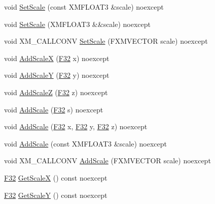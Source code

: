 \begin{DoxyCompactItemize}
\item 
void \hyperlink{structmage_1_1_transform_node_a135418b2bdc0ebdfb12cb747ece38d48}{Set\+Scale} (const X\+M\+F\+L\+O\+A\+T3 \&scale) noexcept
\item 
void \hyperlink{structmage_1_1_transform_node_aaaa992bbd1ebad4b858fcb28ce2781d0}{Set\+Scale} (X\+M\+F\+L\+O\+A\+T3 \&\&scale) noexcept
\item 
void X\+M\+\_\+\+C\+A\+L\+L\+C\+O\+NV \hyperlink{structmage_1_1_transform_node_ad90daae6725ce76c43429ef5ab90c2da}{Set\+Scale} (F\+X\+M\+V\+E\+C\+T\+OR scale) noexcept
\item 
void \hyperlink{structmage_1_1_transform_node_acdf6f3a092fa47d428f3f4e9215160d9}{Add\+ScaleX} (\hyperlink{namespacemage_aa97e833b45f06d60a0a9c4fc22ae02c0}{F32} x) noexcept
\item 
void \hyperlink{structmage_1_1_transform_node_ab41eee8e27e8f155c7de643841953b45}{Add\+ScaleY} (\hyperlink{namespacemage_aa97e833b45f06d60a0a9c4fc22ae02c0}{F32} y) noexcept
\item 
void \hyperlink{structmage_1_1_transform_node_ae4550e69f9197e400ec21a3665cb5e34}{Add\+ScaleZ} (\hyperlink{namespacemage_aa97e833b45f06d60a0a9c4fc22ae02c0}{F32} z) noexcept
\item 
void \hyperlink{structmage_1_1_transform_node_ac45f837c9dc6e8cd143a72337b69893e}{Add\+Scale} (\hyperlink{namespacemage_aa97e833b45f06d60a0a9c4fc22ae02c0}{F32} s) noexcept
\item 
void \hyperlink{structmage_1_1_transform_node_af50ac0e9e6d7f6d610e9e399ebf05716}{Add\+Scale} (\hyperlink{namespacemage_aa97e833b45f06d60a0a9c4fc22ae02c0}{F32} x, \hyperlink{namespacemage_aa97e833b45f06d60a0a9c4fc22ae02c0}{F32} y, \hyperlink{namespacemage_aa97e833b45f06d60a0a9c4fc22ae02c0}{F32} z) noexcept
\item 
void \hyperlink{structmage_1_1_transform_node_a7ae8445a7f447ae832efafdfc20c3add}{Add\+Scale} (const X\+M\+F\+L\+O\+A\+T3 \&scale) noexcept
\item 
void X\+M\+\_\+\+C\+A\+L\+L\+C\+O\+NV \hyperlink{structmage_1_1_transform_node_ae8d3002804b23e5f8fcf4bd092869819}{Add\+Scale} (F\+X\+M\+V\+E\+C\+T\+OR scale) noexcept
\item 
\hyperlink{namespacemage_aa97e833b45f06d60a0a9c4fc22ae02c0}{F32} \hyperlink{structmage_1_1_transform_node_a7c3e1b4a002bff02c7c5b9d10346a006}{Get\+ScaleX} () const noexcept
\item 
\hyperlink{namespacemage_aa97e833b45f06d60a0a9c4fc22ae02c0}{F32} \hyperlink{structmage_1_1_transform_node_a30c5a1f0d549f3d082a04336831c2314}{Get\+ScaleY} () const noexcept

\end{DoxyCompactItemize}
